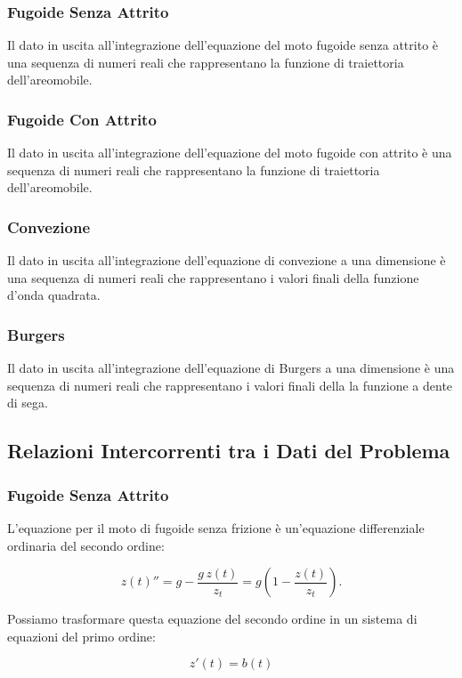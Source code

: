 \subsubsection*{Fugoide Senza Attrito}
Il dato in uscita all'integrazione dell'equazione del moto fugoide senza attrito è una sequenza di numeri reali che rappresentano la funzione di traiettoria dell'areomobile.
\subsubsection*{Fugoide Con Attrito}
Il dato in uscita all'integrazione dell'equazione del moto fugoide con attrito è una sequenza di numeri reali che rappresentano la funzione di traiettoria dell'areomobile.
\subsubsection*{Convezione}
Il dato in uscita all'integrazione dell'equazione di convezione a una dimensione è una sequenza di numeri reali che rappresentano i valori finali della funzione d'onda quadrata.
\subsubsection*{Burgers}
Il dato in uscita all'integrazione dell'equazione di Burgers a una dimensione è una sequenza di numeri reali che rappresentano i valori finali della la funzione a dente di sega.

\subsection{Relazioni Intercorrenti tra i Dati del Problema}

\subsubsection*{Fugoide Senza Attrito}
L’equazione per il moto di fugoide senza frizione è un’equazione differenziale ordinaria del secondo ordine:

\begin{equation}
z(t)'' = g - \frac{g \,z(t)}{z_t} = g \left(1 - \frac{z(t)}{z_t}\right).
\end{equation}

\noindent
Possiamo trasformare questa equazione del secondo ordine in un sistema di equazioni del primo ordine:

\begin{equation}
z'(t) = b(t)
\end{equation}

